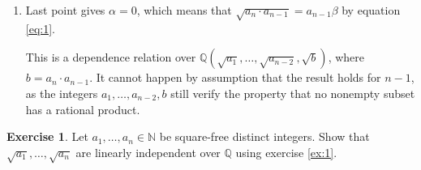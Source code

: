 \documentclass[12pt,a4paper]{article}
\theoremstyle{plain}
\newtheorem*{Sol*}{Solution}
\theoremstyle{definition}
\newtheorem{Ex}{Exercise}
\def \N {\mathbb N}
\def \Q {\mathbb Q}
\newif\ifsolutions
\newcommand{\exercise}[2]{
			\begin{Ex} #1 \end{Ex}
			\ifsolutions  \begin{Sol*} #2 \end{Sol*} \bigskip \else \bigskip  \fi
		}
\begin{document}
{\begin{enumerate}
		If $\alpha \beta \neq 0$, then relation \eqref{eq:2} means that $ \sqrt{a_{n-1}} \in \Q(\sqrt{a_1}, \dots, \sqrt{a_{n-2}})$, which cannot happen by assumption that the result holds for $n-1$.

		\item Last point gives $\alpha = 0$, which means that $\sqrt{a_n \cdot a_{n-1}} = a_{n-1} \beta$ by equation \eqref{eq:1}.
		
		This is a dependence relation over $\Q(\sqrt{a_1}, \dots, \sqrt{a_{n-2}}, \sqrt{b})$, where $b = a_n \cdot a_{n-1}$.
		It cannot happen by assumption that the result holds for $n-1$, as the integers $a_1, \dots, a_{n-2}, b$ still verify the property that no nonempty subset has a rational product.
	\end{enumerate}
}

\exercise{
	Let $a_1, \dots, a_n \in \N$ be square-free distinct integers. Show that $\sqrt{a_1}, \dots, \sqrt{a_n}$ are linearly independent over $\Q$ using exercise \ref{ex:1}.
}{
	Consider $p_1, \dots, p_N$ the primes dividing the integers $a_1, \dots, a_n$.
	By assumption, each $a_i$ $(1 \leq i \leq n)$ is a nonempty product of the primes.

	By exercise \ref{ex:1}, they are linearly independent over the rationals.
}
\end{document}
